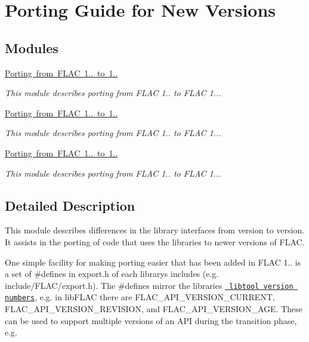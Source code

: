 \hypertarget{group__porting}{}\section{Porting Guide for New Versions}
\label{group__porting}
\subsection*{Modules}
\begin{DoxyCompactItemize}
\item 
\mbox{\hyperlink{group__porting__1__1__2__to__1__1__3}{Porting from F\+L\+A\+C 1.. to 1..}}
\begin{DoxyCompactList}\small\item\em This module describes porting from F\+L\+AC 1.. to F\+L\+AC 1... \end{DoxyCompactList}\item 
\mbox{\hyperlink{group__porting__1__1__3__to__1__1__4}{Porting from F\+L\+A\+C 1.. to 1..}}
\begin{DoxyCompactList}\small\item\em This module describes porting from F\+L\+AC 1.. to F\+L\+AC 1... \end{DoxyCompactList}\item 
\mbox{\hyperlink{group__porting__1__1__4__to__1__2__0}{Porting from F\+L\+A\+C 1.. to 1..}}
\begin{DoxyCompactList}\small\item\em This module describes porting from F\+L\+AC 1.. to F\+L\+AC 1... \end{DoxyCompactList}\end{DoxyCompactItemize}


\subsection{Detailed Description}
This module describes differences in the library interfaces from version to version. It assists in the porting of code that uses the libraries to newer versions of F\+L\+AC.

One simple facility for making porting easier that has been added in F\+L\+AC 1.. is a set of {\ttfamily \#defines} in {\ttfamily export.\+h} of each library\textquotesingle{}s includes (e.\+g. {\ttfamily include/\+F\+L\+A\+C/export.\+h}). The {\ttfamily \#defines} mirror the libraries\textquotesingle{} \href{http://www.gnu.org/software/libtool/manual/libtool.html\#Libtool-versioning}{\texttt{ libtool version numbers}}, e.\+g. in lib\+F\+L\+AC there are {\ttfamily F\+L\+A\+C\+\_\+\+A\+P\+I\+\_\+\+V\+E\+R\+S\+I\+O\+N\+\_\+\+C\+U\+R\+R\+E\+NT}, {\ttfamily F\+L\+A\+C\+\_\+\+A\+P\+I\+\_\+\+V\+E\+R\+S\+I\+O\+N\+\_\+\+R\+E\+V\+I\+S\+I\+ON}, and {\ttfamily F\+L\+A\+C\+\_\+\+A\+P\+I\+\_\+\+V\+E\+R\+S\+I\+O\+N\+\_\+\+A\+GE}. These can be used to support multiple versions of an A\+PI during the transition phase, e.\+g.


